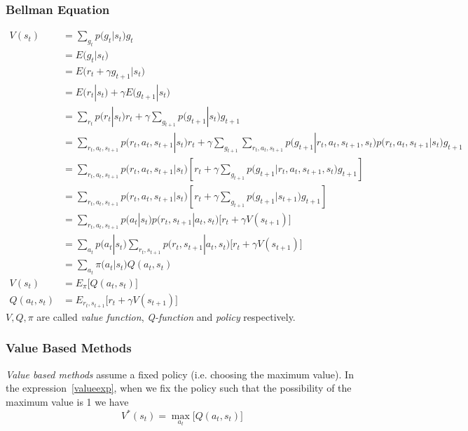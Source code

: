 \documentclass{article}
\begin{document}
\subsubsection{Bellman Equation}
\begin{align}
    V(s_t) 
    &= \sum_{g_t}p\big(g_t|s_t\big)g_t\\
    &= E\big(g_t|s_t\big)\\
    &= E\big(r_{t}+\gamma g_{t+1}|s_t\big)\\
    &= E(r_t|s_t)+\gamma E\big(g_{t+1}|s_t\big)\\
    &= \sum_{r_t}p\big(r_t|s_t\big)r_t+\gamma \sum_{g_{t+1}}p\big(g_{t+1}|s_t\big)g_{t+1}\\
    &= \sum_{r_t,a_t,s_{t+1}}p\big(r_t,a_t,s_{t+1}|s_t\big)r_t+\gamma \sum_{g_{t+1}}\sum_{r_t,a_t,s_{t+1}}p\big(g_{t+1}|r_t,a_t,s_{t+1},s_t\big)p\big(r_t,a_t,s_{t+1}|s_t\big)g_{t+1}\\
    &= \sum_{r_t,a_t,s_{t+1}}p\big(r_t,a_t,s_{t+1}|s_t\big)\left[r_t+\gamma \sum_{g_{t+1}}p\big(g_{t+1}|r_t,a_t,s_{t+1},s_t\big)g_{t+1}\right]\\
    &= \sum_{r_t,a_t,s_{t+1}}p\big(r_t,a_t,s_{t+1}|s_t\big)\left[r_t+\gamma \sum_{g_{t+1}}p\big(g_{t+1}|s_{t+1}\big)g_{t+1}\right]\\
    &= \sum_{r_t,a_t,s_{t+1}}p\big(a_t|s_t\big)p\big(r_t,s_{t+1}|a_t,s_t\big)\big[r_t+\gamma V(s_{t+1})\big]\\
    &= \sum_{a_t}p\big(a_t|s_t\big)\sum_{r_t,s_{t+1}}p\big(r_t,s_{t+1}|a_t,s_t\big)\big[r_t+\gamma V(s_{t+1})\big]\\
    &= \sum_{a_t}\pi\big(a_t|s_t\big)Q(a_t, s_t)\\
    V(s_t) &= E_\pi\big[Q(a_t, s_t)\big]\\
    Q(a_t, s_t) &= E_{r_t, s_{t+1}}\big[r_t+\gamma V(s_{t+1})\big]\label{valueexp}
\end{align}
$V, Q, \pi$ are called \textit{value function}, \textit{Q-function} and \textit{policy} respectively. 
\subsubsection{Value Based Methods}
\textit{Value based methods} assume a fixed policy (i.e. choosing the maximum value). In the expression~\ref{valueexp}, when we fix the policy such that the possibility of the maximum value is 1 we have 
\begin{equation}
    V^*(s_t) = \max_{a_t}\big[Q(a_t, s_t)\big]
\end{equation}
\end{document}
